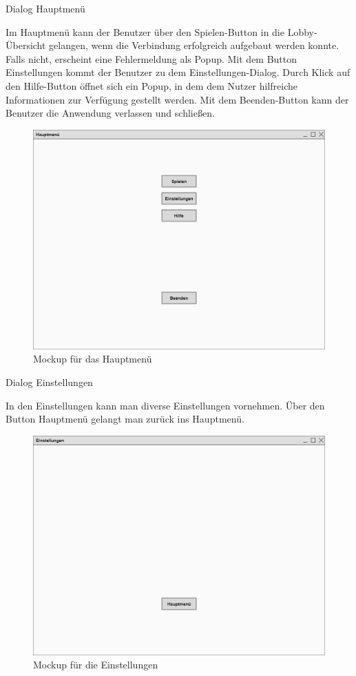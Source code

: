 Dialog \glqq{}Hauptmenü\grqq{}

Im Hauptmenü kann der Benutzer über den Spielen-Button in die Lobby-Übersicht gelangen, wenn die Verbindung erfolgreich aufgebaut werden konnte. Falls nicht, erscheint eine Fehlermeldung als Popup. Mit dem Button Einstellungen kommt der Benutzer zu dem Einstellungen-Dialog. Durch Klick auf den Hilfe-Button öffnet sich ein Popup, in dem dem Nutzer hilfreiche Informationen zur Verfügung gestellt werden. Mit dem Beenden-Button kann der Benutzer die Anwendung verlassen und schließen.

\begin{figure}
  \centering
  \includegraphics[width=\textwidth]{Meilenstein03/Hauptmenue_Mockup.png}
  \caption{Mockup für das Hauptmenü}
\end{figure}

Dialog \glqq{}Einstellungen\grqq{}

In den Einstellungen kann man diverse Einstellungen vornehmen. Über den Button Hauptmenü gelangt man zurück ins Hauptmenü.

\begin{figure}
  \centering
  \includegraphics[width=\textwidth]{Meilenstein03/Einstellungen_Mockup.png}
  \caption{Mockup für die Einstellungen}
\end{figure}

